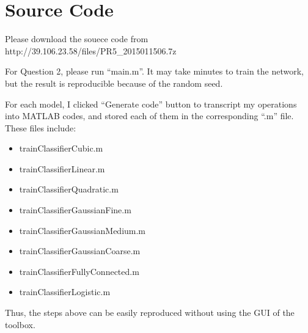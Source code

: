 \documentclass{article}
\begin{document}
\section*{Source Code}
{
    Please download the souece code from http://39.106.23.58/files/PR5\_2015011506.7z

    For Question 2, please run ``main.m''. It may take minutes to train the network, but the result is reproducible because of the random seed.

    For each model, I clicked ``Generate code'' button to transcript my operations into MATLAB codes, and stored each of them in the corresponding ``.m'' file. These files include:
    \begin{itemize}
        \item trainClassifierCubic.m
        \item trainClassifierLinear.m
        \item trainClassifierQuadratic.m
        \item trainClassifierGaussianFine.m
        \item trainClassifierGaussianMedium.m
        \item trainClassifierGaussianCoarse.m
        \item trainClassifierFullyConnected.m
        \item trainClassifierLogistic.m
    \end{itemize}
    Thus, the steps above can be easily reproduced without using the GUI of the toolbox. 

}

\clearpage
\end{document}
